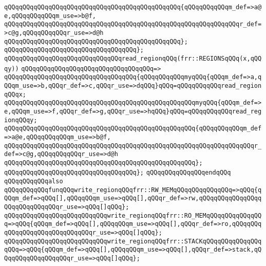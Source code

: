 \newline
\verb|qQQqqQQqqQQqqQQqqQQqqQQqqQQqqQQqqQQqqQQqqQQqqQQq{qQQqqQQqqQQqm_def=>a@e,qQQqqQQqqQQqm_use=>b@f,|\newline
\verb|qQQqqQQqqQQqqQQqqQQqqQQqqQQqqQQqqQQqqQQqqQQqqQQqqQQqqQQqqQQqqQQqr_def=>c@g,qQQqqQQqqQQqr_use=>d@h|\newline
\verb|qQQqqQQqqQQqqQQqqQQqqQQqqQQqqQQqqQQqqQQqqQQqqQQq};|\newline
\verb|qQQqqQQqqQQqqQQqqQQqqQQqqQQqqQQqqQQq};|\newline
\newline
\verb|qQQqqQQqqQQqqQQqqQQqqQQqqQQqqQQqread_regionqQQq(frr::REGIONSqQQq(x,qQQqy))|\newline
\verb|qQQqqQQqqQQqqQQqqQQqqQQqqQQqqQQqqQQq=>|\newline
\verb|qQQqqQQqqQQqqQQqqQQqqQQqqQQqqQQqqQQq{qQQqqQQqqQQqmyqQQq{qQQqm_def=>a,qQQqm_use=>b,qQQqr_def=>c,qQQqr_use=>dqQQq}qQQq=qQQqqQQqqQQqread_regionqQQqx;|\newline
\verb|qQQqqQQqqQQqqQQqqQQqqQQqqQQqqQQqqQQqqQQqqQQqqQQqqQQqmyqQQq{qQQqm_def=>e,qQQqm_use=>f,qQQqr_def=>g,qQQqr_use=>hqQQq}qQQq=qQQqqQQqqQQqread_regionqQQqy;|\newline
\newline
\verb|qQQqqQQqqQQqqQQqqQQqqQQqqQQqqQQqqQQqqQQqqQQqqQQqqQQq{qQQqqQQqqQQqm_def=>a@e,qQQqqQQqqQQqm_use=>b@f,|\newline
\verb|qQQqqQQqqQQqqQQqqQQqqQQqqQQqqQQqqQQqqQQqqQQqqQQqqQQqqQQqqQQqqQQqqQQqr_def=>c@g,qQQqqQQqqQQqr_use=>d@h|\newline
\verb|qQQqqQQqqQQqqQQqqQQqqQQqqQQqqQQqqQQqqQQqqQQqqQQqqQQq};|\newline
\verb|qQQqqQQqqQQqqQQqqQQqqQQqqQQqqQQqqQQq};|\newline
\verb|qQQqqQQqqQQqqQQqendqQQq|\newline
\newline
\verb|qQQqqQQqqQQqalso|\newline
\verb|qQQqqQQqqQQqfunqQQqwrite_regionqQQqfrr::RW_MEMqQQqqQQqqQQqqQQq=>qQQq{qQQqm_def=>qQQq[],qQQqqQQqm_use=>qQQq[],qQQqr_def=>rw,qQQqqQQqqQQqqQQqqQQqqQQqqQQqqQQqr_use=>qQQq[]qQQq};|\newline
\verb|qQQqqQQqqQQqqQQqqQQqqQQqqQQqwrite_regionqQQqfrr::RO_MEMqQQqqQQqqQQqqQQq=>qQQq{qQQqm_def=>qQQq[],qQQqqQQqm_use=>qQQq[],qQQqr_def=>ro,qQQqqQQqqQQqqQQqqQQqqQQqqQQqqQQqr_use=>qQQq[]qQQq};|\newline
\verb|qQQqqQQqqQQqqQQqqQQqqQQqqQQqwrite_regionqQQqfrr::STACKqQQqqQQqqQQqqQQqqQQq=>qQQq{qQQqm_def=>qQQq[],qQQqqQQqm_use=>qQQq[],qQQqr_def=>stack,qQQqqQQqqQQqqQQqqQQqr_use=>qQQq[]qQQq};|\newline
